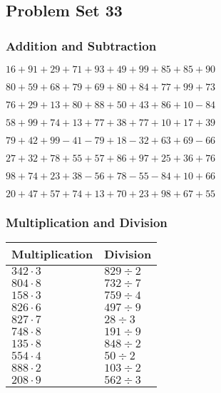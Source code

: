 \hypertarget{problem-set-33}{%
\subsection{Problem Set 33}\label{problem-set-33}}

\hypertarget{addition-and-subtraction}{%
\subsubsection{Addition and
Subtraction}\label{addition-and-subtraction}}

\(16+91+29+71+93+49+99+85+85+90\)

\(80+59+68+79+69+80+84+77+99+73\)

\(76+29+13+80+88+50+43+86+10-84\)

\(58+99+74+13+77+38+77+10+17+39\)

\(79+42+99-41-79+18-32+63+69-66\)

\(27+32+78+55+57+86+97+25+36+76\)

\(98+74+23+38-56+78-55-84+10+66\)

\(20+47+57+74+13+70+23+98+67+55\)

\hypertarget{multiplication-and-division}{%
\subsubsection{Multiplication and
Division}\label{multiplication-and-division}}

\begin{longtable}[]{@{}ll@{}}
\toprule
Multiplication & Division\tabularnewline
\midrule
\endhead
\(342\cdot3\) & \(829÷2\)\tabularnewline
\(804\cdot8\) & \(732÷7\)\tabularnewline
\(158\cdot3\) & \(759÷4\)\tabularnewline
\(826\cdot6\) & \(497÷9\)\tabularnewline
\(827\cdot7\) & \(28÷3\)\tabularnewline
\(748\cdot8\) & \(191÷9\)\tabularnewline
\(135\cdot8\) & \(848÷2\)\tabularnewline
\(554\cdot4\) & \(50÷2\)\tabularnewline
\(888\cdot2\) & \(103÷2\)\tabularnewline
\(208\cdot9\) & \(562÷3\)\tabularnewline
\bottomrule
\end{longtable}
